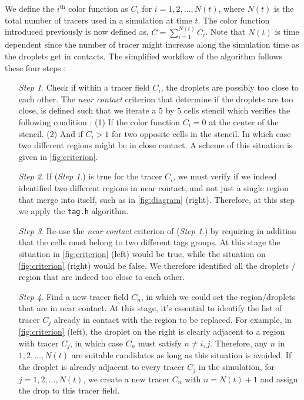 We define the $i^\text{th}$ color function as $C_i$ for $i =1,2,\ldots,N(t)$, where $N(t)$ is the total number of tracers used in a simulation at time $t$.
The color function introduced previously is now defined as, $C = \sum_{i=1}^{N(t)} C_i$. 
Note that $N(t)$ is time dependent since the number of tracer might increase along the simulation time as the droplets get in contacts. 
The simplified workflow of the algorithm follows these four steps : 
\begin{enumerate}
    \item[\textit{Step 1}.] Check if within a tracer field $C_i$, the droplets are possibly too close to each other. 
    The \textit{near contact} criterion that determine if the droplets are too close, is defined such that we iterate a $5$ by $5$ cells stencil which verifies the following condition : 
    (1) If the color function $C_i = 0$ at the center of the stencil. 
    (2) And if $C_i > 1$ for two opposite cells in the stencil. 
    In which case two different regions might be in close contact.
    A scheme of this situation is given in \ref{fig:criterion}.  
    \item[\textit{Step 2}.] 
    If (\textit{Step 1}.) is true for the tracer $C_i$, we must verify if we indeed identified two different regions in near contact, and not just a single region that merge into itself, such as in \ref{fig:diagram} (right). 
    Therefore, at this step  we apply the \texttt{tag.h} algorithm.
    \item[\textit{Step 3}.] Re-use the \textit{near contact} criterion of (\textit{Step 1}.) by requiring in addition that the cells must belong to two different tags groups. 
    At this stage the situation in \ref{fig:criterion} (left) would be true, while the situation on \ref{fig:criterion} (right) would be false. 
    We therefore identified all the droplets / region that are indeed too close to each other. 
    \item[\textit{Step 4}.] 
    Find a new tracer field $C_n$, in which we could set the region/droplets that are in near contact. 
    At this stage, it's essential to identify the list of tracer $C_j$ already in contact with the region to be replaced. 
    For example, in \ref{fig:criterion} (left), the droplet on the right is clearly adjacent to a region with tracer $C_j$, in which case $C_n$ must satisfy $n \neq i,j$. 
    Therefore, any $n$ in $1, 2, \ldots, N(t)$ are suitable candidates as long as this situation is avoided. 
    If the droplet is already adjacent to every tracer $C_j$ in the simulation, for $j = 1, 2, \ldots, N(t)$, we create a new tracer $C_n$ with $n = N(t)+1$ and assign the drop to this tracer field.
\end{enumerate}
